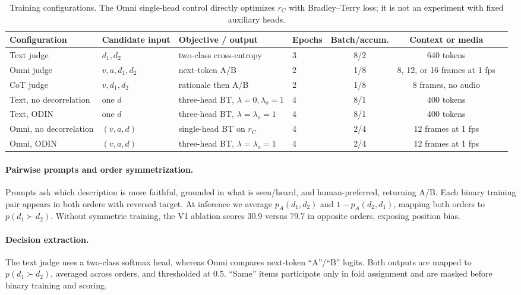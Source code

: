 \begin{table}[t]
  \centering
  \caption{Training configurations. The Omni single-head control directly optimizes $r_C$ with Bradley--Terry loss; it is not an experiment with fixed auxiliary heads.}
  \label{tab:repro}
  \begin{tabular}{llllccc}
    \toprule
    Configuration & Candidate input & Objective / output & Epochs & Batch/accum. & Context or media \\
    \midrule
    Text judge & $d_1,d_2$ & two-class cross-entropy & 3 & 8/2 & 640 tokens \\
    Omni judge & $v,a,d_1,d_2$ & next-token A/B & 2 & 1/8 & 8, 12, or 16 frames at 1 fps \\
    CoT judge & $v,d_1,d_2$ & rationale then A/B & 2 & 1/8 & 8 frames, no audio \\
    Text, no decorrelation & one $d$ & three-head BT, $\lambda=0,\lambda_o=1$ & 4 & 8/1 & 400 tokens \\
    Text, ODIN & one $d$ & three-head BT, $\lambda=\lambda_o=1$ & 4 & 8/1 & 400 tokens \\
    Omni, no decorrelation & $(v,a,d)$ & single-head BT on $r_C$ & 4 & 2/4 & 12 frames at 1 fps \\
    Omni, ODIN & $(v,a,d)$ & three-head BT, $\lambda=\lambda_o=1$ & 4 & 2/4 & 12 frames at 1 fps \\
    \bottomrule
  \end{tabular}
\end{table}

\paragraph{Pairwise prompts and order symmetrization.}
Prompts ask which description is more faithful, grounded in what is seen/heard, and human-preferred, returning A/B. Each binary training pair appears in both orders with reversed target. At inference we average $p_A(d_1,d_2)$ and $1-p_A(d_2,d_1)$, mapping both orders to $p(d_1\succ d_2)$. Without symmetric training, the V1 ablation scores 30.9 versus 79.7 \waf in opposite orders, exposing position bias.

\paragraph{Decision extraction.}
The text judge uses a two-class softmax head, whereas Omni compares next-token ``A''/``B'' logits. Both outputs are mapped to $p(d_1\succ d_2)$, averaged across orders, and thresholded at 0.5. ``Same'' items participate only in fold assignment and are masked before binary training and scoring.

